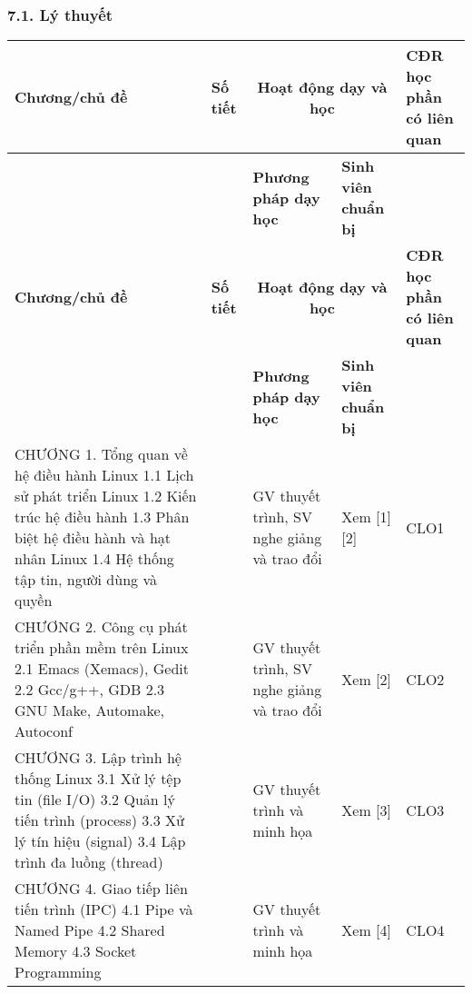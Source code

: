 \documentclass[a4paper,13pt]{article}
\begin{document}
\subsubsection*{7.1. Lý thuyết}
\begin{longtable}{|>{\raggedright\arraybackslash}p{6cm}|>{\centering\arraybackslash}p{1.5cm}|p{4.5cm}|>{\centering\arraybackslash}p{2.5cm}|>{\centering\arraybackslash}p{1.5cm}|}
\hline
\textbf{Chương/chủ đề} & \textbf{Số tiết} & \multicolumn{2}{c|}{\textbf{Hoạt động dạy và học}} & \textbf{CĐR học phần có liên quan} \\
\cline{3-4}
& & \textbf{Phương pháp dạy học} & \textbf{Sinh viên chuẩn bị} & \\
\hline
\endfirsthead
\hline
\textbf{Chương/chủ đề} & \textbf{Số tiết} & \multicolumn{2}{c|}{\textbf{Hoạt động dạy và học}} & \textbf{CĐR học phần có liên quan} \\
\cline{3-4}
& & \textbf{Phương pháp dạy học} & \textbf{Sinh viên chuẩn bị} & \\
\hline
\endhead
CHƯƠNG 1. Tổng quan về hệ điều hành Linux
1.1 Lịch sử phát triển Linux
1.2 Kiến trúc hệ điều hành
1.3 Phân biệt hệ điều hành và hạt nhân Linux
1.4 Hệ thống tập tin, người dùng và quyền & 5 & GV thuyết trình, SV nghe giảng và trao đổi & Xem [1][2] & CLO1 \\
\hline
CHƯƠNG 2. Công cụ phát triển phần mềm trên Linux
2.1 Emacs (Xemacs), Gedit
2.2 Gcc/g++, GDB
2.3 GNU Make, Automake, Autoconf & 5 & GV thuyết trình, SV nghe giảng và trao đổi & Xem [2] & CLO2 \\
\hline
CHƯƠNG 3. Lập trình hệ thống Linux
3.1 Xử lý tệp tin (file I/O)
3.2 Quản lý tiến trình (process)
3.3 Xử lý tín hiệu (signal)
3.4 Lập trình đa luồng (thread) & 5 & GV thuyết trình và minh họa & Xem [3] & CLO3 \\
\hline
CHƯƠNG 4. Giao tiếp liên tiến trình (IPC)
4.1 Pipe và Named Pipe
4.2 Shared Memory
4.3 Socket Programming & 5 & GV thuyết trình và minh họa & Xem [4] & CLO4 \\
\hline
\end{longtable}
\end{document}
